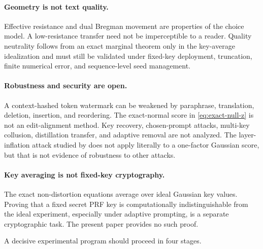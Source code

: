 \documentclass[11pt]{article}
\theoremstyle{definition}
\theoremstyle{remark}
\begin{document}
\paragraph{Geometry is not text quality.}
Effective resistance and dual Bregman movement are properties of the choice model. A low-resistance transfer need not be imperceptible to a reader. Quality neutrality follows from an exact marginal theorem only in the key-average idealization and must still be validated under fixed-key deployment, truncation, finite numerical error, and sequence-level seed management.

\paragraph{Robustness and security are open.}
A context-hashed token watermark can be weakened by paraphrase, translation, deletion, insertion, and reordering. The exact-normal score in \eqref{eq:exact-null-z} is not an edit-alignment method. Key recovery, chosen-prompt attacks, multi-key collusion, distillation transfer, and adaptive removal are not analyzed. The layer-inflation attack studied by \citet{omidi2026synthid} does not apply literally to a one-factor Gaussian score, but that is not evidence of robustness to other attacks.

\paragraph{Key averaging is not fixed-key cryptography.}
The exact non-distortion equations average over ideal Gaussian key values. Proving that a fixed secret PRF key is computationally indistinguishable from the ideal experiment, especially under adaptive prompting, is a separate cryptographic task. The present paper provides no such proof.

A decisive experimental program should proceed in four stages.
\end{document}
